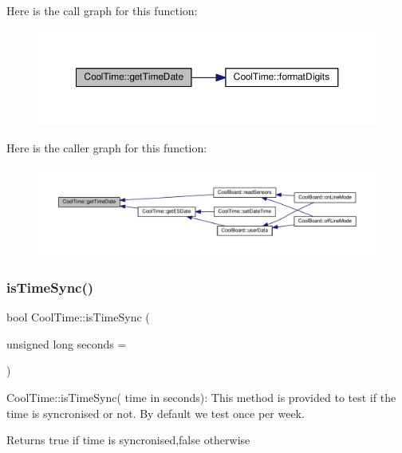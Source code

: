 Here is the call graph for this function\+:\nopagebreak
\begin{figure}[H]
\begin{center}
\leavevmode
\includegraphics[width=350pt]{class_cool_time_a7a7501c5ca77dd1248bea704c44f986c_cgraph}
\end{center}
\end{figure}
Here is the caller graph for this function\+:\nopagebreak
\begin{figure}[H]
\begin{center}
\leavevmode
\includegraphics[width=350pt]{class_cool_time_a7a7501c5ca77dd1248bea704c44f986c_icgraph}
\end{center}
\end{figure}
\mbox{\label{class_cool_time_a5ae038a4498602b189f76a10bf02adf8}} 
\subsubsection{\texorpdfstring{is\+Time\+Sync()}{isTimeSync()}}
{\footnotesize\ttfamily bool Cool\+Time\+::is\+Time\+Sync (\begin{DoxyParamCaption}\item[{unsigned long}]{seconds = {} }\end{DoxyParamCaption})}

Cool\+Time\+::is\+Time\+Sync( time in seconds)\+: This method is provided to test if the time is syncronised or not. By default we test once per week.

\begin{DoxyReturn}{Returns}
true if time is syncronised,false otherwise 
\end{DoxyReturn}


